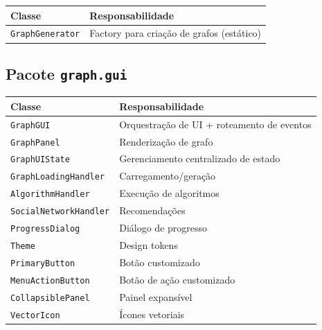 \documentclass[12pt,a4paper]{article}
\begin{document}
    \begin{table}[h]
        \centering
        \begin{tabular}{|l|l|}
            \hline
            \textbf{Classe} & \textbf{Responsabilidade} \\
            \hline
            \texttt{GraphGenerator} & Factory para criação de grafos (estático) \\
            \hline
        \end{tabular}
    \end{table}

    \subsection{Pacote \texttt{graph.gui}}

    \begin{table}[h]
        \centering
        \begin{tabular}{|l|l|}
            \hline
            \textbf{Classe} & \textbf{Responsabilidade} \\
            \hline
            \texttt{GraphGUI} & Orquestração de UI + roteamento de eventos \\
            \hline
            \texttt{GraphPanel} & Renderização de grafo \\
            \hline
            \texttt{GraphUIState} & Gerenciamento centralizado de estado \\
            \hline
            \texttt{GraphLoadingHandler} & Carregamento/geração \\
            \hline
            \texttt{AlgorithmHandler} & Execução de algoritmos \\
            \hline
            \texttt{SocialNetworkHandler} & Recomendações \\
            \hline
            \texttt{ProgressDialog} & Diálogo de progresso \\
            \hline
            \texttt{Theme} & Design tokens \\
            \hline
            \texttt{PrimaryButton} & Botão customizado \\
            \hline
            \texttt{MenuActionButton} & Botão de ação customizado \\
            \hline
            \texttt{CollapsiblePanel} & Painel expansível \\
            \hline
            \texttt{VectorIcon} & Ícones vetoriais \\
            \hline
        \end{tabular}
    \end{table}
\end{document}
